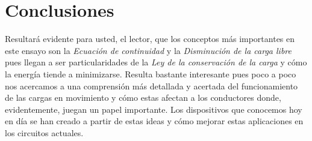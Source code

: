 \section{Conclusiones}
Resultará evidente para usted, el lector, que los conceptos más importantes en este ensayo son la \emph{Ecuación de continuidad} y la \emph{Disminución de la carga libre} pues llegan a ser particularidades de la \emph{Ley de la conservación de la carga} y cómo la energía tiende a minimizarse. Resulta bastante interesante pues poco a poco nos acercamos a una comprensión más detallada y acertada del funcionamiento de las cargas en movimiento y cómo estas afectan a los conductores donde, evidentemente, juegan un papel importante. Los dispositivos que conocemos hoy en día se han creado a partir de estas ideas y cómo mejorar estas aplicaciones en los circuitos actuales. 